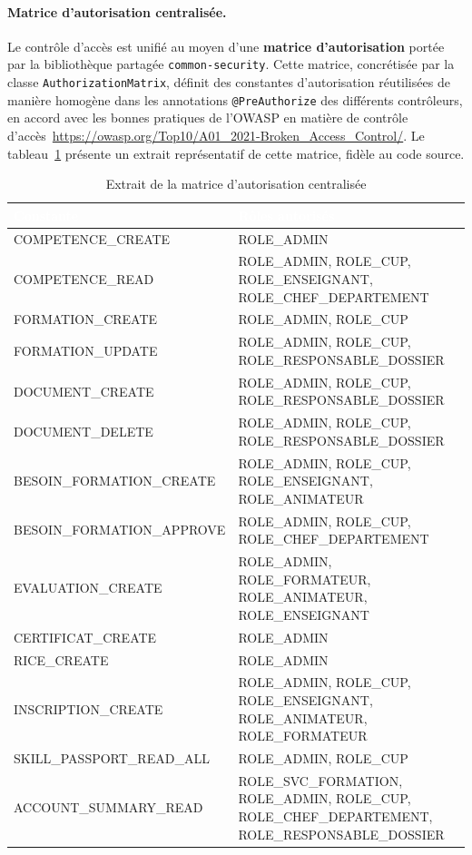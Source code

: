 \documentclass[12pt,a4paper]{report}
\renewcommand{\thead}[1]{\cellcolor{espritblue}\textcolor{white}{\textbf{#1}}}
\begin{document}
\paragraph{Matrice d'autorisation centralisée.}
Le contrôle d'accès est unifié au moyen d'une \textbf{matrice
d'autorisation} portée par la bibliothèque partagée
\texttt{common-security}. Cette matrice, concrétisée par la classe
\texttt{AuthorizationMatrix}, définit des constantes d'autorisation
réutilisées de manière homogène dans les annotations
\texttt{@PreAuthorize} des différents contrôleurs, en accord avec les
bonnes pratiques de l'OWASP en matière de contrôle d'accès~\url{https://owasp.org/Top10/A01_2021-Broken_Access_Control/}.
Le tableau~\ref{tab:rbac} présente un extrait représentatif de cette
matrice, fidèle au code source.

\begin{table}[H]
\centering
\caption{Extrait de la matrice d'autorisation centralisée}
\label{tab:rbac}
{\small\renewcommand{\arraystretch}{1.15}
\begin{tabularx}{\textwidth}{>{\ttfamily}p{4.8cm} X}
\toprule
\normalfont\thead{Constante} & \thead{Rôles autorisés} \\
\midrule
COMPETENCE\_CREATE & ROLE\_ADMIN \\
COMPETENCE\_READ & ROLE\_ADMIN, ROLE\_CUP, ROLE\_ENSEIGNANT, ROLE\_CHEF\_DEPARTEMENT \\
FORMATION\_CREATE & ROLE\_ADMIN, ROLE\_CUP \\
FORMATION\_UPDATE & ROLE\_ADMIN, ROLE\_CUP, ROLE\_RESPONSABLE\_DOSSIER \\
DOCUMENT\_CREATE & ROLE\_ADMIN, ROLE\_CUP, ROLE\_RESPONSABLE\_DOSSIER \\
DOCUMENT\_DELETE & ROLE\_ADMIN, ROLE\_CUP, ROLE\_RESPONSABLE\_DOSSIER \\
BESOIN\_FORMATION\_CREATE & ROLE\_ADMIN, ROLE\_CUP, ROLE\_ENSEIGNANT, ROLE\_ANIMATEUR \\
BESOIN\_FORMATION\_APPROVE & ROLE\_ADMIN, ROLE\_CUP, ROLE\_CHEF\_DEPARTEMENT \\
EVALUATION\_CREATE & ROLE\_ADMIN, ROLE\_FORMATEUR, ROLE\_ANIMATEUR, ROLE\_ENSEIGNANT \\
CERTIFICAT\_CREATE & ROLE\_ADMIN \\
RICE\_CREATE & ROLE\_ADMIN \\
INSCRIPTION\_CREATE & ROLE\_ADMIN, ROLE\_CUP, ROLE\_ENSEIGNANT, ROLE\_ANIMATEUR, ROLE\_FORMATEUR \\
SKILL\_PASSPORT\_READ\_ALL & ROLE\_ADMIN, ROLE\_CUP \\
ACCOUNT\_SUMMARY\_READ & ROLE\_SVC\_FORMATION, ROLE\_ADMIN, ROLE\_CUP, ROLE\_CHEF\_DEPARTEMENT, ROLE\_RESPONSABLE\_DOSSIER \\
\bottomrule
\end{tabularx}}
\end{table}
\end{document}
